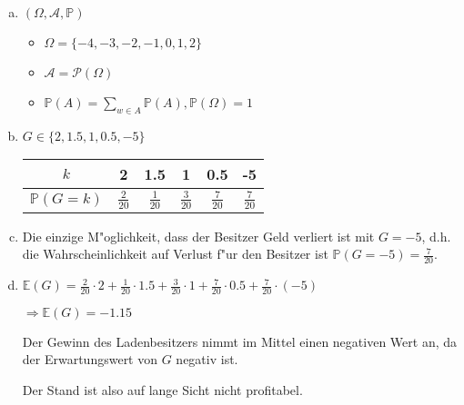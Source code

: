 \documentclass[a4paper,12pt]{article}
\begin{document}
    \begin{enumerate}[(a)]
        \item 

        $ (\Omega, \mathcal{A}, \mathbb{P}) $

        \begin{itemize}
            \item $ \Omega = \{-4, -3, -2, -1, 0, 1, 2\} $
            \item $ \mathcal{A} = \mathcal{P}(\Omega) $
            \item $ \displaystyle \mathbb{P}(A) = \sum\limits_{w \in A} \mathbb{P}(A), \mathbb{P}(\Omega) = 1 $
        \end{itemize}

        \item

        $ G \in \{2, 1.5, 1, 0.5, -5\} $

        \bigskip

        \setlength{\tabcolsep}{10pt} %
        \renewcommand{\arraystretch}{2.5} %
        \begin{tabular}{c|c|c|c|c|c}
            $ k $ & 2 & 1.5 & 1 & 0.5 & -5 \\
            \hline
            $ \displaystyle \mathbb{P}(G = k) $ & $ \displaystyle \frac{2}{20} $ & $ \displaystyle \frac{1}{20} $ & $ \displaystyle \frac{3}{20} $ & $ \displaystyle \frac{7}{20} $ & $ \displaystyle\frac{7}{20} $ \\
        \end{tabular}

        \bigskip

        \item

        Die einzige M"oglichkeit, dass der Besitzer Geld verliert ist mit $ G = -5 $, d.h. die Wahrscheinlichkeit auf Verlust
        f"ur den Besitzer ist $ \mathbb{P}(G = -5) = \frac{7}{20} $.

        \item

        $ \displaystyle \mathbb{E}(G) = \frac{2}{20} \cdot 2 + \frac{1}{20} \cdot 1.5 + \frac{3}{20} \cdot 1 + \frac{7}{20} \cdot 0.5 + \frac{7}{20} \cdot (-5) $

        $ \Rightarrow \mathbb{E}(G) = -1.15 $

        Der Gewinn des Ladenbesitzers nimmt im Mittel einen negativen Wert an, da der Erwartungswert von $ G $ negativ ist.

        Der Stand ist also auf lange Sicht nicht profitabel.
    \end{enumerate}
\end{document}
